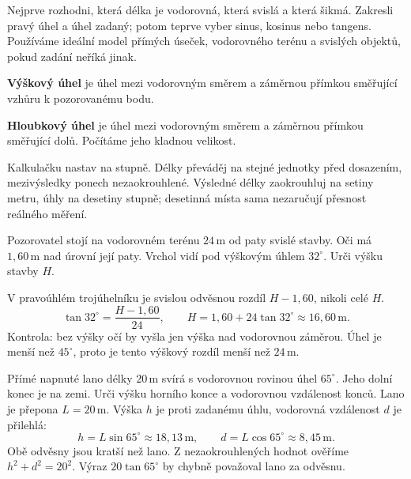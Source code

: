 \documentclass[11pt,a4paper]{article}
\begin{document}
Nejprve rozhodni, která délka je vodorovná, která svislá a která šikmá.
Zakresli pravý úhel a úhel zadaný; potom teprve vyber sinus, kosinus nebo tangens.
Používáme ideální model přímých úseček, vodorovného terénu a svislých objektů,
pokud zadání neříká jinak.
\begin{definiceBox}
\textbf{Výškový úhel} je úhel mezi vodorovným směrem a záměrnou přímkou
směřující vzhůru k pozorovanému bodu.
\end{definiceBox}
\begin{definiceBox}
\textbf{Hloubkový úhel} je úhel mezi vodorovným směrem a záměrnou přímkou
směřující dolů. Počítáme jeho kladnou velikost.
\end{definiceBox}
Kalkulačku nastav na stupně. Délky převáděj na stejné jednotky před dosazením,
mezivýsledky ponech nezaokrouhlené. Výsledné délky zaokrouhluj na setiny metru,
úhly na desetiny stupně; desetinná místa sama nezaručují přesnost reálného měření.

\begin{prikladReseniBox}[title={P1: výška stavby a výška očí}]
Pozorovatel stojí na vodorovném terénu $24\,\mathrm m$ od paty svislé stavby.
Oči má $1{,}60\,\mathrm m$ nad úrovní její paty. Vrchol vidí pod výškovým úhlem
$32^\circ$. Urči výšku stavby $H$.
\tcblower
\begin{center}
\end{center}
V pravoúhlém trojúhelníku je svislou odvěsnou rozdíl $H-1{,}60$, nikoli celé $H$.
\[
\tan32^\circ=\frac{H-1{,}60}{24},
\qquad H=1{,}60+24\tan32^\circ\approx16{,}60\,\mathrm m.
\]
Kontrola: bez výšky očí by vyšla jen výška nad vodorovnou záměrou.
Úhel je menší než $45^\circ$, proto je tento výškový rozdíl menší než $24\,\mathrm m$.
\end{prikladReseniBox}

\begin{prikladReseniBox}[title={P2: šikmá délka není vodorovná vzdálenost},breakable=false]
Přímé napnuté lano délky $20\,\mathrm m$ svírá s vodorovnou rovinou úhel $65^\circ$.
Jeho dolní konec je na zemi. Urči výšku horního konce a vodorovnou vzdálenost konců.
\tcblower
Lano je přepona $L=20\,\mathrm m$. Výška $h$ je proti zadanému úhlu,
vodorovná vzdálenost $d$ je přilehlá:
\[
h=L\sin65^\circ\approx18{,}13\,\mathrm m,\qquad
d=L\cos65^\circ\approx8{,}45\,\mathrm m.
\]
Obě odvěsny jsou kratší než lano. Z nezaokrouhlených hodnot ověříme
$h^2+d^2=20^2$. Výraz $20\tan65^\circ$ by chybně považoval lano za odvěsnu.
\end{prikladReseniBox}
\end{document}
